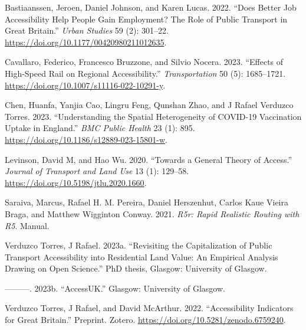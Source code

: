 \documentclass{article}
\newlength{\cslhangindent}
\newlength{\cslentryspacingunit} %
\newenvironment{CSLReferences}[2] %
 {%
  \setlength{\parindent}{0pt}
  \ifodd #1
  \let\oldpar\par
  \def\par{\hangindent=\cslhangindent\oldpar}
  \fi
  \setlength{\parskip}{#2\cslentryspacingunit}
 }%
 {}
\begin{document}
\hypertarget{refs}{}
\begin{CSLReferences}{1}{0}
\leavevmode{}%
Bastiaanssen, Jeroen, Daniel Johnson, and Karen Lucas. 2022. {``Does
Better Job Accessibility Help People Gain Employment? {The} Role of
Public Transport in {Great Britain}.''} \emph{Urban Studies} 59 (2):
301--22. \url{https://doi.org/10.1177/00420980211012635}.

\leavevmode{}%
Cavallaro, Federico, Francesco Bruzzone, and Silvio Nocera. 2023.
{``Effects of High-Speed Rail on Regional Accessibility.''}
\emph{Transportation} 50 (5): 1685--1721.
\url{https://doi.org/10.1007/s11116-022-10291-y}.

\leavevmode{}%
Chen, Huanfa, Yanjia Cao, Lingru Feng, Qunshan Zhao, and J Rafael
Verduzco Torres. 2023. {``Understanding the Spatial Heterogeneity of
{COVID-19} Vaccination Uptake in {England}.''} \emph{BMC Public Health}
23 (1): 895. \url{https://doi.org/10.1186/s12889-023-15801-w}.

\leavevmode{}%
Levinson, David M, and Hao Wu. 2020. {``Towards a General Theory of
Access.''} \emph{Journal of Transport and Land Use} 13 (1): 129--58.
\url{https://doi.org/10.5198/jtlu.2020.1660}.

\leavevmode{}%
Saraiva, Marcus, Rafael H. M. Pereira, Daniel Herszenhut, Carlos Kaue
Vieira Braga, and Matthew Wigginton Conway. 2021. \emph{R5r: {Rapid}
Realistic Routing with {R5}}. Manual.

\leavevmode{}%
Verduzco Torres, J Rafael. 2023a. {``Revisiting the Capitalization of
Public Transport Accessibility into Residential Land Value: An Empirical
Analysis Drawing on {Open Science}.''} PhD thesis, {Glasgow}: University
of Glasgow.

\leavevmode{}%
---------. 2023b. {``{AccessUK}.''} {Glasgow}: University of Glasgow.

\leavevmode{}%
Verduzco Torres, J Rafael, and David McArthur. 2022. {``Accessibility
{Indicators} for {Great Britain}.''} Preprint. {Zotero}.
\url{https://doi.org/10.5281/zenodo.6759240}.

\end{CSLReferences}



\end{document}
